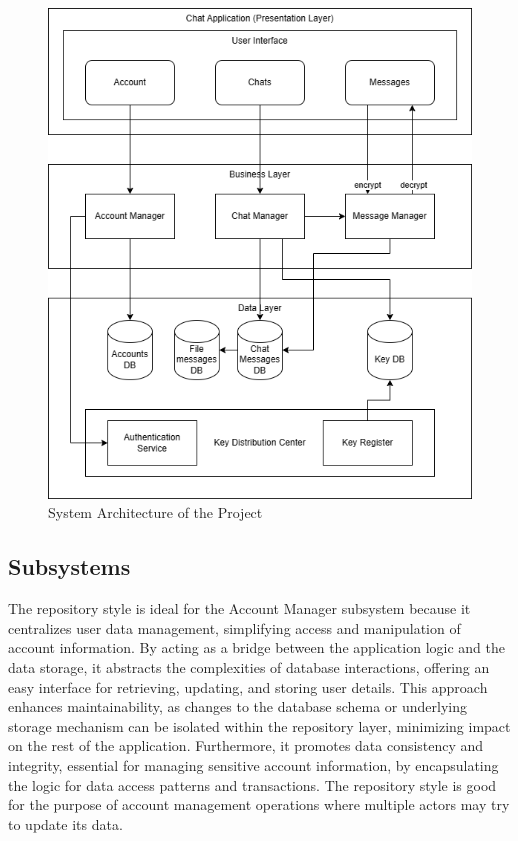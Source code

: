 \documentclass[]{article}
\begin{document}
\begin{figure}[H]
	\centering
	\includegraphics[width=1\textwidth]{architecture_diagram.drawio.png}
	\caption{System Architecture of the Project}
\end{figure}


\subsection{Subsystems}
\label{sub:subsystems}

The repository style is ideal for the Account Manager subsystem because it centralizes user data management, simplifying access and manipulation of account information. By acting as a bridge between the application logic and the data storage, it abstracts the complexities of database interactions, offering an easy interface for retrieving, updating, and storing user details. This approach enhances maintainability, as changes to the database schema or underlying storage mechanism can be isolated within the repository layer, minimizing impact on the rest of the application. Furthermore, it promotes data consistency and integrity, essential for managing sensitive account information, by encapsulating the logic for data access patterns and transactions. The repository style is good for the purpose of account management operations where multiple actors may try to update its data. \\
\end{document}
